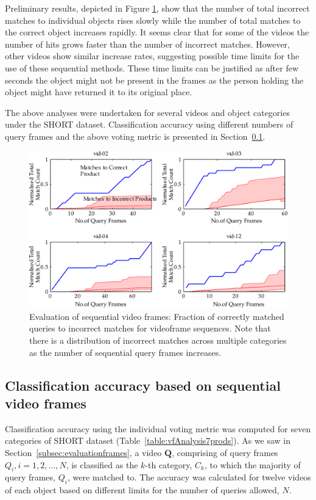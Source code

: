 Preliminary results, depicted in Figure \ref{fig:prd003b}, show that the number of total incorrect matches to individual objects rises slowly while the number of total matches to the correct object increases rapidly. It seems clear that for some of the videos the number of hits grows faster than the number of incorrect matches. However, other videos show similar increase rates, suggesting possible time limits for the use of these sequential methods. These time limits can be justified as after few seconds the object might not be present in the frames as the person holding the object might have returned it to its original place.

The above analyses were undertaken for several videos and object categories under the SHORT dataset. Classification accuracy using different numbers of query frames and the above voting metric is presented in Section~\ref{sec:expResults2}.


\begin{figure}[h!]
\centering
\includegraphics[width=\linewidth]{./gfx/Chapter03/prd0030shadedPlots-4-latex.pdf}
\caption{Evaluation of sequential video frames: Fraction of correctly matched queries to incorrect matches for videoframe sequences. Note that there is a distribution of incorrect matches across multiple categories as the number of sequential query frames increases.}        
\label{fig:prd003b}
\end{figure}


\subsection{Classification accuracy based on sequential video frames} \label{sec:expResults2}

Classification accuracy using the individual voting metric was computed for seven categories of SHORT dataset (Table~\ref{table:vfAnalysis7prods}). As we saw in Section~\ref{subsec:evaluationframes}, a video $\mathbf{Q}$, comprising of query frames $Q_i, i = 1,2,...,N$, is classified as the $k$-th category, $C_k$, to which the majority of query frames, $Q_i$, were matched to. The accuracy was calculated for twelve videos of each object based on different limits for the number of queries allowed, $N$.

